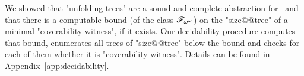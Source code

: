 
We showed that "unfolding trees" are a sound and complete abstraction for \COVER\ and that there is a computable bound (of the class $\mathscr{F}_{\omega^\omega}$) on the "size@@tree" of a minimal "coverability witness", if it exists. Our decidability procedure computes that bound, enumerates all trees of "size@@tree" below the bound and checks for each of them whether it is "coverability witness". Details can be found in Appendix~\ref{app:decidability}.

\decidablecover*


